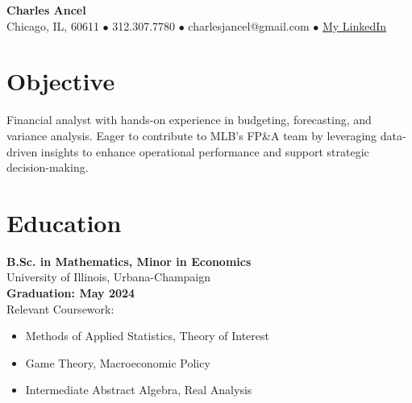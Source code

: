 \documentclass[10pt]{article}
\begin{document}
\begin{center}
{\Large\textbf{Charles Ancel}}\\
\vspace{5pt}
\small{Chicago, IL, 60611 \(\bullet\) 312.307.7780 \(\bullet\) charlesjancel@gmail.com \(\bullet\) \href{https://www.linkedin.com/in/charles-j-ancel/}{My LinkedIn}}
\end{center}

\vspace{-10pt}
\section*{Objective}
\vspace{0pt}
Financial analyst with hands-on experience in budgeting, forecasting, and variance analysis. Eager to contribute to MLB's FP\&A team by leveraging data-driven insights to enhance operational performance and support strategic decision-making.

\vspace{-10pt}
\section*{Education}
\vspace{0pt}
\begin{multicols}{2}
\textbf{B.Sc. in Mathematics, Minor in Economics} \\
University of Illinois, Urbana-Champaign \\
\textbf{Graduation: May 2024} \\

Relevant Coursework:
\begin{itemize}[noitemsep,nosep]
    \item Methods of Applied Statistics, Theory of Interest
    \item Game Theory, Macroeconomic Policy
    \item Intermediate Abstract Algebra, Real Analysis
\end{itemize}
\end{multicols}

\vspace{-10pt}
\end{document}
